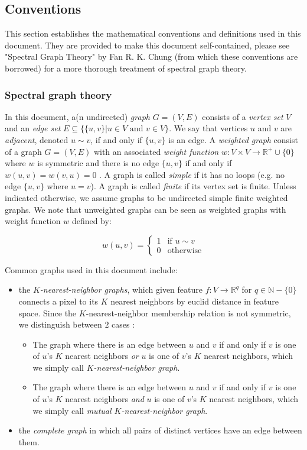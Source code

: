 \subsection{Conventions}

This section establishes the mathematical conventions and definitions used in this document. They are provided to make this document self-contained, please see "Spectral Graph Theory" by Fan R. K. Chung \cite{chung1997spectral} (from which these conventions are borrowed) for a more thorough treatment of spectral graph theory.

\subsubsection{Spectral graph theory}
In this document, a(n undirected) \emph{graph} $G = (V, E)$ consists of a \emph{vertex set} $V$ and an \emph{edge set} $E \subseteq \{\{u, v\} | u \in V \text{ and } v \in V\}$. We say that vertices $u$ and $v$ are \emph{adjacent}, denoted $u \sim v$, if and only if $\{u,v\}$ is an edge. A \emph{weighted graph} consist of a graph $G = (V, E)$ with an associated \emph{weight function} $w : V \times V \rightarrow \mathbb{R}^+ \cup \{0\}$ where $w$ is symmetric and there is no edge $\{u,v\}$ if and only if $w(u,v) = w(v,u) = 0$ . A graph is called \emph{simple} if it has no loops (e.g. no edge $\{u, v\}$ where $u = v$). A graph is called \emph{finite} if its vertex set is finite. Unless indicated otherwise, we assume graphs to be undirected simple finite weighted graphs. We note that unweighted graphs can be seen as weighted graphs with weight function $w$ defined by:

\[
w(u,v) = \begin{cases}
1 & \text{if }u \sim v \\
0 & \text{otherwise}
\end{cases}
\]

Common graphs used in this document include:
\begin{itemize}
\item the \emph{$K$-nearest-neighbor graphs}, which given feature $f  : V \rightarrow \mathbb{R}^q$ for $q \in \mathbb{N} - \{0\}$ connects a pixel to its $K$ nearest neighbors by euclid distance in feature space. Since the $K$-nearest-neighbor membership relation is not symmetric, we distinguish between $2$ cases \cite{von2007tutorial}:
\begin{itemize}
\item The graph where there is an edge between $u$ and $v$ if  and only if $v$ is one of $u$'s $K$ nearest neighbors \emph{or} $u$ is one of $v$'s $K$ nearest neighbors, which we simply call \emph{$K$-nearest-neighbor graph}.
\item The graph where there is an edge between $u$ and $v$ if and only if $v$ is one of $u$'s $K$ nearest neighbors \emph{and} $u$ is one of $v$'s $K$ nearest neighbors, which we simply call \emph{mutual $K$-nearest-neighbor graph}.
\end{itemize}
\item the \emph{complete graph} in which all pairs of distinct vertices have an edge between them.
\end{itemize}

